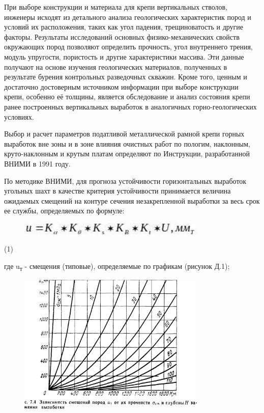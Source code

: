 При выборе конструкции и материала для крепи вертикальных стволов,
инженеры исходят из детального анализа геологических характеристик пород
и условий их расположения, таких как угол падения, трещиноватость и
другие факторы. Результаты исследований основных физико-механических
свойств окружающих пород позволяют определить прочность, угол
внутреннего трения, модуль упругости, пористость и другие характеристики
массива. Эти данные получают на основе изучения геологических
материалов, полученных в результате бурения контрольных разведочных
скважин. Кроме того, ценным и достаточно достоверным источником
информации при выборе конструкции крепи, особенно её толщины, является
обследование и анализ состояния крепи ранее построенных вертикальных
выработок в аналогичных горно-геологических условиях.

Выбор и расчет параметров податливой металлической рамной крепи горных
выработок вне зоны и в зоне влияния очистных работ по пологим,
наклонным, круто-наклонным и крутым платам определяют по Инструкции,
разработанной ВНИМИ в 1991 году.

По методике ВНИМИ, для прогноза устойчивости горизонтальных выработок
угольных шахт в качестве критерия устойчивости принимается величина
ожидаемых смещений на контуре сечения незакрепленной выработки за весь
срок ее службы, определяемых по формуле:

\begin{figure}[H]
	\centering
	\includegraphics[width=0.8\textwidth]{assets/1123}
	\caption*{}
\end{figure} (1)

где u\textsubscript{т} - смещения (типовые), определяемые по графикам
(рисунок Д.1);

\begin{figure}[H]
	\centering
	\includegraphics[width=0.8\textwidth]{assets/1124}
	\caption*{}
\end{figure}

